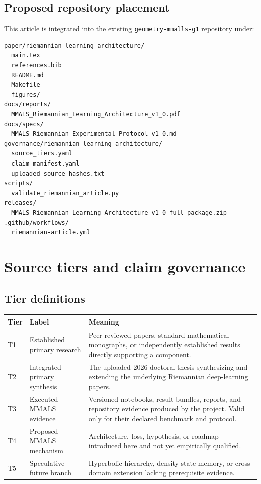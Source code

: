 \subsection{Proposed repository placement}
This article is integrated into the existing \texttt{geometry-mmalls-g1} repository under:
\begin{verbatim}
paper/riemannian_learning_architecture/
  main.tex
  references.bib
  README.md
  Makefile
  figures/
docs/reports/
  MMALS_Riemannian_Learning_Architecture_v1_0.pdf
docs/specs/
  MMALS_Riemannian_Experimental_Protocol_v1_0.md
governance/riemannian_learning_architecture/
  source_tiers.yaml
  claim_manifest.yaml
  uploaded_source_hashes.txt
scripts/
  validate_riemannian_article.py
releases/
  MMALS_Riemannian_Learning_Architecture_v1_0_full_package.zip
.github/workflows/
  riemannian-article.yml
\end{verbatim}


\section{Source tiers and claim governance}

\subsection{Tier definitions}
\begin{center}
\begin{tabularx}{\textwidth}{@{}llX@{}}
\toprule
Tier & Label & Meaning \\
\midrule
T1 & Established primary research & Peer-reviewed papers, standard mathematical monographs, or independently established results directly supporting a component. \\
T2 & Integrated primary synthesis & The uploaded 2026 doctoral thesis synthesizing and extending the underlying Riemannian deep-learning papers. \\
T3 & Executed MMALS evidence & Versioned notebooks, result bundles, reports, and repository evidence produced by the project. Valid only for their declared benchmark and protocol. \\
T4 & Proposed MMALS mechanism & Architecture, loss, hypothesis, or roadmap introduced here and not yet empirically qualified. \\
T5 & Speculative future branch & Hyperbolic hierarchy, density-state memory, or cross-domain extension lacking prerequisite evidence. \\
\bottomrule
\end{tabularx}
\end{center}

